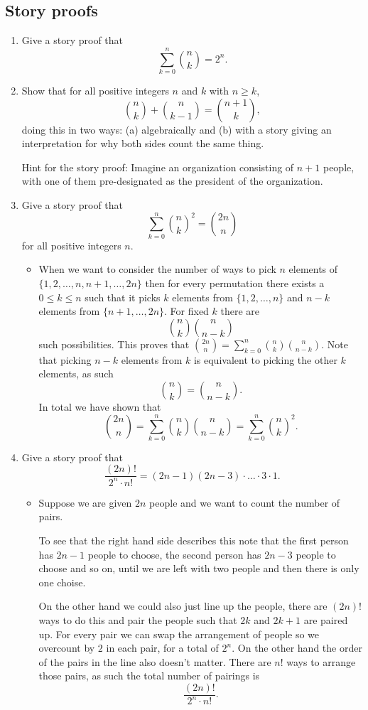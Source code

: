 \documentclass{article}
\begin{document}
\subsection{Story proofs}
\begin{enumerate}
	\item Give a story proof that
	$$
	\sum_{k = 0}^n \binom{n}{k} = 2^n.
	$$
	\item Show that for all positive integers $n$ and $k$ with $n \geq k$,
	$$
	\binom{n}{k} + \binom{n}{k - 1} = \binom{n + 1}{k},
	$$
	doing this in two ways: (a) algebraically and (b) with a story giving an interpretation for why both sides count the same thing.

	Hint for the story proof: Imagine an organization consisting of $n + 1$ people, with one of them pre-designated as the president of the organization.
	\item Give a story proof that
	$$
	\sum_{k = 0}^n \binom{n}{k}^2 = \binom{2n}{n}
	$$
	for all positive integers $n$.
		\begin{itemize}
			\item When we want to consider the number of ways to pick $n$ elements of $\{1, 2, \dots, n, n + 1, \dots, 2n\}$ then for every permutation there exists a $0 \leq k \leq n$ such that it picks $k$ elements from $\{1, 2, \dots, n\}$ and $n - k$ elements from $\{n + 1, \dots, 2n\}$. For fixed $k$ there are
			$$
			\binom{n}{k} \binom{n}{n - k}
			$$
			such possibilities. This proves that $\binom{2n}{n} = \sum_{k = 0}^n \binom{n}{k} \binom{n}{n - k}$. Note that picking $n - k$ elements from $k$ is equivalent to picking the other $k$ elements, as such
			$$
			\binom{n}{k} = \binom{n}{n - k}.
			$$
			In total we have shown that
			$$
			\binom{2n}{n} = \sum_{k = 0}^n \binom{n}{k} \binom{n}{n - k} = \sum_{k = 0}^n \binom{n}{k}^2.
			$$
		\end{itemize}
	\item Give a story proof that
	$$
	\frac{(2n)!}{2^n \cdot n!} = (2n - 1) (2n - 3) \cdot \dots \cdot 3 \cdot 1.
	$$
		\begin{itemize}
			\item Suppose we are given $2n$ people and we want to count the number of pairs.

			To see that the right hand side describes this note that the first person has $2n - 1$ people to choose, the second person has $2n - 3$ people to choose and so on, until we are left with two people and then there is only one choise.

			On the other hand we could also just line up the people, there are $(2n)!$ ways to do this and pair the people such that $2k$ and $2k + 1$ are paired up. For every pair we can swap the arrangement of people so we overcount by $2$ in each pair, for a total of $2^n$. On the other hand the order of the pairs in the line also doesn't matter. There are $n!$ ways to arrange those pairs, as such the total number of pairings is
			$$
			\frac{(2n)!}{2^n \cdot n!}.
			$$
		\end{itemize}
\end{enumerate}
\end{document}
